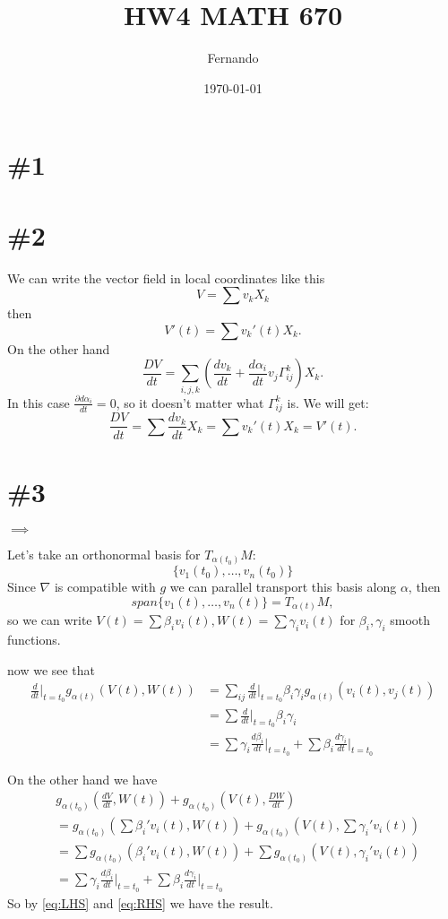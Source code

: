 \documentclass{article}
\begin{document}
\newcommand{\R}{\mathbb{R}}

\title{HW4 MATH 670}
\author{Fernando}
\date{\today}
\maketitle

\section*{\#1}
\section*{\#2}
We can write the vector field in local coordinates like this
\[
  V=\sum v_kX_k
\]
then
\[
  V'(t)=\sum v_k'(t)X_k.
\]
On the other hand
\[
  \frac{DV}{dt}=\sum_{i,j,k}\left(\frac{dv_k}{dt}+\frac{d\alpha_i}{dt}v_j\Gamma^k_{ij}\right)X_k.
\]
In this case \(\frac{\partial d\alpha_i}{dt}=0\), so it doesn't matter what \(\Gamma^k_{ij}\) is. We will get:
\[
  \frac{DV}{dt}=\sum\frac{dv_k}{dt}X_k=\sum v_k'(t)X_k=V'(t).
\]
\section*{\#3}

\(\implies\)

Let's take an orthonormal basis for \(T_{\alpha(t_0)}M\):
\[\{v_1(t_0),\dots,v_n(t_0)\}\]
Since \(\nabla\) is compatible with \(g\) we can parallel transport this basis along \(\alpha\),
then
\[
  span\{v_1(t),\dots,v_n(t)\}=T_{\alpha(t)}M,
\]
so we can write \( V(t)=\sum\beta_iv_i(t), W(t)=\sum\gamma_iv_i(t)
\) for \(\beta_i,\gamma_i\) smooth functions.

now we see that
\begin{align}
  \label{eq:LHS}
  \frac{d}{dt}\bigg|_{t=t_0}g_{\alpha(t)}(V(t),W(t))&=\sum_{ij}
  \frac{d}{dt}\bigg|_{t=t_0}\beta_i\gamma_ig_{\alpha(t)}(v_i(t),v_j(t)) \nonumber\\
  &=\sum\frac{d}{dt}\bigg|_{t=t_0}\beta_i\gamma_i \nonumber\\
  &=\sum\gamma_i\frac{d\beta_i}{dt}\bigg|_{t=t_0}+\sum\beta_i\frac{d\gamma_i}{dt}\bigg|_{t=t_0}
\end{align}

On the other hand we have
\begin{align}
  \label{eq:RHS}
  &g_{\alpha(t_0)}\left(\frac{dV}{dt},W(t)\right) + g_{\alpha(t_0)}\left(V(t),\frac{DW}{dt}\right) \nonumber\\
  &= g_{\alpha(t_0)}\left(\sum\beta_i'v_i(t),W(t)\right) + g_{\alpha(t_0)}\left(V(t),\sum\gamma_i'v_i(t)\right)\nonumber\\
  &= \sum g_{\alpha(t_0)}\left(\beta_i'v_i(t),W(t)\right) + \sum g_{\alpha(t_0)}\left(V(t),\gamma_i'v_i(t)\right)\nonumber\\
  &= \sum\gamma_i\frac{d\beta_i}{dt}\bigg|_{t=t_0} + \sum\beta_i\frac{d\gamma_i}{dt}\bigg|_{t=t_0}
\end{align}
So by \eqref{eq:LHS} and \eqref{eq:RHS} we have the result.
\end{document}
